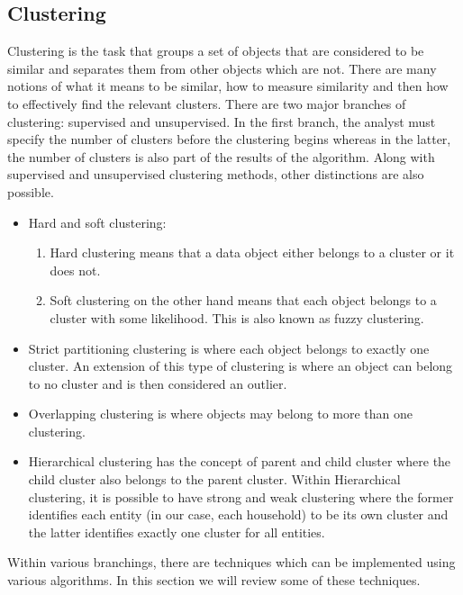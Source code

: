 \documentclass[a4paper]{article}
\begin{document}

%
\subsection{Clustering} \label{subsec:clustering}
Clustering is the task that groups a set of objects that are considered to be similar and separates them from other objects which are not. There are many notions of what it means to be similar, how to measure similarity and then how to effectively find the relevant clusters. There are two major branches of clustering: supervised and unsupervised. In the first branch, the analyst must specify the number of clusters before the clustering begins whereas in the latter, the number of clusters is also part of the results of the algorithm. Along with supervised and unsupervised clustering methods, other distinctions are also possible.
\begin{itemize}
\item Hard and soft clustering: \begin{enumerate} \item Hard clustering means that a data object either belongs to a cluster or it does not. \item Soft clustering on the other hand means that each object belongs to a cluster with some likelihood. This is also known as fuzzy clustering. \end{enumerate}
\item Strict partitioning clustering is where each object belongs to exactly one cluster. An extension of this type of clustering is where an object can belong to no cluster and is then considered an outlier.
\item Overlapping clustering is where objects may belong to more than one clustering.
\item Hierarchical clustering has the concept of parent and child cluster where the child cluster also belongs to the parent cluster. Within Hierarchical clustering, it is possible to have strong and weak clustering where the former identifies each entity (in our case, each household) to be its own cluster and the latter identifies exactly one cluster for all entities.
\end{itemize}

Within various branchings, there are techniques which can be implemented using various algorithms. In this section we will review some of these techniques.
\end{document}
